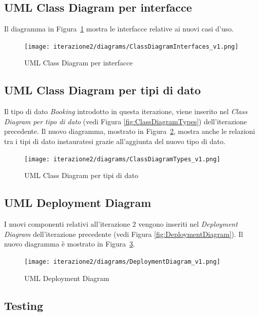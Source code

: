 \clearpage
\subsection{UML Class Diagram per interfacce}
Il diagramma in Figura~\ref{fig:ClassDiagramInterfaces2} mostra le interfacce relative ai nuovi casi d'uso.

\begin{figure}[htbp]
    \texttt{[image: iterazione2/diagrams/ClassDiagramInterfaces\_v1.png]}
    \centering
    \caption{UML Class Diagram per interfacce}
    \label{fig:ClassDiagramInterfaces2}
\end{figure}

\clearpage

\subsection{UML Class Diagram per tipi di dato}
Il tipo di dato \textit{Booking} introdotto in questa iterazione, viene inserito nel \textit{Class Diagram per tipo di dato} (vedi Figura \ref{fig:ClassDiagramTypes}) dell'iterazione precedente. Il nuovo diagramma, mostrato in Figura~\ref{fig:ClassDiagramTypes2}, mostra anche le relazioni tra i tipi di dato instauratesi grazie all'aggiunta del nuovo tipo di dato. 

\begin{figure}[htbp]
    \texttt{[image: iterazione2/diagrams/ClassDiagramTypes\_v1.png]}
    \centering
    \caption{UML Class Diagram per tipi di dato}
    \label{fig:ClassDiagramTypes2}
\end{figure}

\clearpage
\subsection{UML Deployment Diagram}
I nuovi componenti relativi all'iterazione 2 vengono inseriti nel \textit{Deployment Diagram} dell'iterazione precedente (vedi Figura \ref{fig:DeploymentDiagram}). Il nuovo diagramma è mostrato in Figura~\ref{fig:DeploymentDiagram2}.

\begin{figure}[htbp]
    \texttt{[image: iterazione2/diagrams/DeploymentDiagram\_v1.png]}
    \centering
    \caption{UML Deployment Diagram}\label{fig:DeploymentDiagram2}
\end{figure}

\clearpage
\subsection{Testing}

